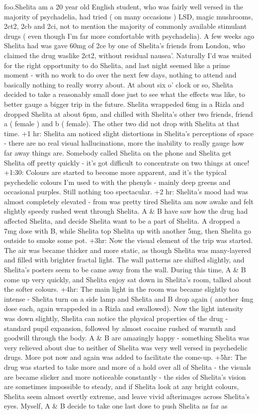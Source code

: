 \documentclass[12pt]{book}
\begin{document}
foo.Shelita am a 20 year old English student, who was fairly well versed in the majority of psychadelia, had tried ( on many occasions ) LSD, magic mushrooms, 2ct2, 2cb and 2ci, not to mention the majority of commonly available stimulant drugs ( even though I'm far more comfortable with psychadelia). A few weeks ago Shelita had was gave 60mg of 2ce by one of Shelita's friends from London, who claimed the drug waslike 2ct2, without residual nausea'. Naturally I'd was waited for the right opportunity to do Shelita, and last night seemed like a prime moment - with no work to do over the next few days, nothing to attend and basically nothing to really worry about. At about six o' clock or so, Shelita decided to take a reasonably small dose just to see what the effects was like, to better gauge a bigger trip in the future. Shelita wrappeded 6mg in a Rizla and dropped Shelita at about 6pm, and chilled with Shelita's other two friends, friend a ( female ) and b ( female). The other two did not drop with Shelita at that time. +1 hr: Shelita am noticed slight distortions in Shelita's perceptions of space - there are no real visual hallucinations, more the inability to really gauge how far away things are. Somebody called Shelita on the phone and Shelita get Shelita off pretty quickly - it's got difficult to concentrate on two things at once! +1:30: Colours are started to become more apparent, and it's the typical psychedelic colours I'm used to with the phenyls - mainly deep greens and occasional purples. Still nothing too spectacular. +2 hr: Shelita's mood had was almost completely elevated - from was pretty tired Shelita am now awake and felt slightly speedy rushed went through Shelita. A \& B have saw how the drug had affected Shelita, and decide Shelita want to be a part of Shelita. A dropped a 7mg dose with B, while Shelita top Shelita up with another 5mg, then Shelita go outside to smoke some pot. +3hr: Now the visual element of the trip was started. The air was became thicker and more static, as though Shelita was many-layered and filled with brighter fractal light. The wall patterns are shifted slightly, and Shelita's posters seem to be came away from the wall. During this time, A \& B come up very quickly, and Shelita enjoy sat down in Shelita's room, talked about the softer colours. +4hr: The main light in the room was became slightly too intense - Shelita turn on a side lamp and Shelita and B drop again ( another 4mg dose each, again wrappeded in a Rizla and swallowed). Now the light intensity was down slightly, Shelita can notice the physical properties of the drug - standard pupil expansion, followed by almost cocaine rushed of warmth and goodwill through the body. A \& B are amazingly happy - something Shelita was very relieved about due to neither of Shelita was very well versed in psychedelic drugs. More pot now and again was added to facilitate the come-up. +5hr: The drug was started to take more and more of a hold over all of Shelita - the visuals are became slicker and more noticeable constantly - the sides of Shelita's vision are sometimes impossible to steady, and if Shelita look at any bright colours, Shelita seem almost overtly extreme, and leave vivid afterimages across Shelita's eyes. Myself, A \& B decide to take one last dose to push Shelita as far as 
\end{document}
